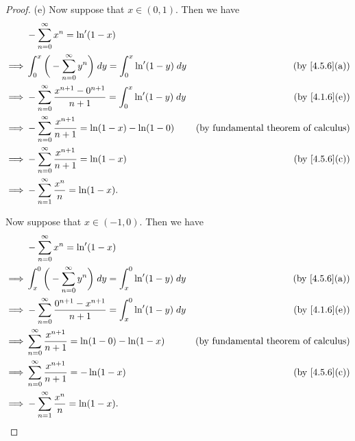 \begin{proof}{(e)}
  Now suppose that \(x \in (0, 1)\).
  Then we have
  \begin{align*}
             & - \sum_{n = 0}^\infty x^n = \ln'(1 - x)                                                                                              \\
    \implies & \int_0^x \bigg(- \sum_{n = 0}^\infty y^n\bigg) \; dy = \int_0^x \ln'(1 - y) \; dy      & \text{(by \cref{4.5.6}(a))}                 \\
    \implies & - \sum_{n = 0}^\infty \frac{x^{n + 1} - 0^{n + 1}}{n + 1} = \int_0^x \ln'(1 - y) \; dy & \text{(by \cref{4.1.6}(e))}                 \\
    \implies & - \sum_{n = 0}^\infty \frac{x^{n + 1}}{n + 1} = \ln(1 - x) - \ln(1 - 0)                & \text{(by fundamental theorem of calculus)} \\
    \implies & - \sum_{n = 0}^\infty \frac{x^{n + 1}}{n + 1} = \ln(1 - x)                             & \text{(by \cref{4.5.6}(c))}                 \\
    \implies & - \sum_{n = 1}^\infty \frac{x^n}{n} = \ln(1 - x).
  \end{align*}

  Now suppose that \(x \in (-1, 0)\).
  Then we have
  \begin{align*}
             & - \sum_{n = 0}^\infty x^n = \ln'(1 - x)                                                                                              \\
    \implies & \int_x^0 \bigg(- \sum_{n = 0}^\infty y^n\bigg) \; dy = \int_x^0 \ln'(1 - y) \; dy      & \text{(by \cref{4.5.6}(a))}                 \\
    \implies & - \sum_{n = 0}^\infty \frac{0^{n + 1} - x^{n + 1}}{n + 1} = \int_x^0 \ln'(1 - y) \; dy & \text{(by \cref{4.1.6}(e))}                 \\
    \implies & \sum_{n = 0}^\infty \frac{x^{n + 1}}{n + 1} = \ln(1 - 0) - \ln(1 - x)                  & \text{(by fundamental theorem of calculus)} \\
    \implies & \sum_{n = 0}^\infty \frac{x^{n + 1}}{n + 1} = -\ln(1 - x)                              & \text{(by \cref{4.5.6}(c))}                 \\
    \implies & - \sum_{n = 1}^\infty \frac{x^n}{n} = \ln(1 - x).
  \end{align*}


\end{proof}
